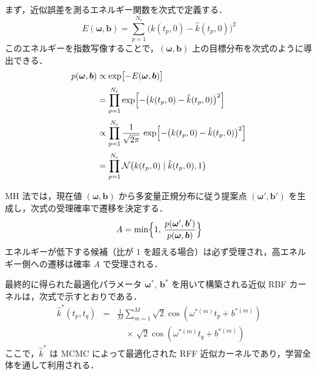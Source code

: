 \documentclass[conference]{IEEEtran}
\begin{document}
まず，近似誤差を測るエネルギー関数を次式で定義する．
\begin{equation}
  E(\boldsymbol{\omega},\boldsymbol{b})
    = \sum_{p=1}^{N_c}
      \bigl(k(t_p,0) - \hat{k}(t_p,0)\bigr)^2
  \label{eq:energy}
\end{equation}
このエネルギーを指数写像することで，$(\boldsymbol{\omega},\boldsymbol{b})$ 上の目標分布を次式のように導出できる．
\begin{equation}
\begin{aligned}
  p(\boldsymbol{\omega},\boldsymbol{b})
  &\propto \exp\bigl[-E(\boldsymbol{\omega},\boldsymbol{b})\bigr] \\[2pt]
  &= \prod_{p=1}^{N_c}\exp\Bigl[-\bigl(k(t_p,0)-\hat{k}(t_p,0)\bigr)^2\Bigr] \\[2pt]
  &\propto \prod_{p=1}^{N_c}\frac{1}{\sqrt{2\pi}}\,
    \exp\Bigl[-\bigl(k(t_p,0)-\hat{k}(t_p,0)\bigr)^2\Bigr] \\[2pt]
  &= \prod_{p=1}^{N_c}
    \mathcal{N}\bigl(k(t_p,0)\mid\hat{k}(t_p,0),1\bigr)
\end{aligned}
\label{eq:target}
\end{equation}

MH 法では，現在値 $(\boldsymbol{\omega},\boldsymbol{b})$ から多変量正規分布に従う提案点 $(\boldsymbol{\omega}',\boldsymbol{b}')$ を生成し，次式の受理確率で遷移を決定する．
\begin{equation}
  A = \min\Bigl\{1,\,
    \frac{p(\boldsymbol{\omega}',\boldsymbol{b}')}{p(\boldsymbol{\omega},\boldsymbol{b})}
  \Bigr\}
  \label{eq:accept}
\end{equation}
エネルギーが低下する候補（比が 1 を超える場合）は必ず受理され，高エネルギー側への遷移は確率 $A$ で受理される．

最終的に得られた最適化パラメータ $\boldsymbol{\omega}^{\ast},\,\boldsymbol{b}^{\ast}$ を用いて構築される近似 RBF カーネルは，次式で示すとおりである．
\begin{eqnarray}
  \hat{k}^{\ast}(t_p,t_q)
    &=& \frac{1}{M}\sum_{m=1}^M \sqrt{2}\cos(\omega^{\ast(m)}t_p + b^{\ast(m)}) \nonumber\\
    &&\quad \times\,\sqrt{2}\cos(\omega^{\ast(m)}t_q + b^{\ast(m)})
  \label{eq:rff_kernel_opt}
\end{eqnarray}
ここで，$\hat{k}^{\ast}$ は MCMC によって最適化された RFF 近似カーネルであり，学習全体を通して利用される．
\end{document}
